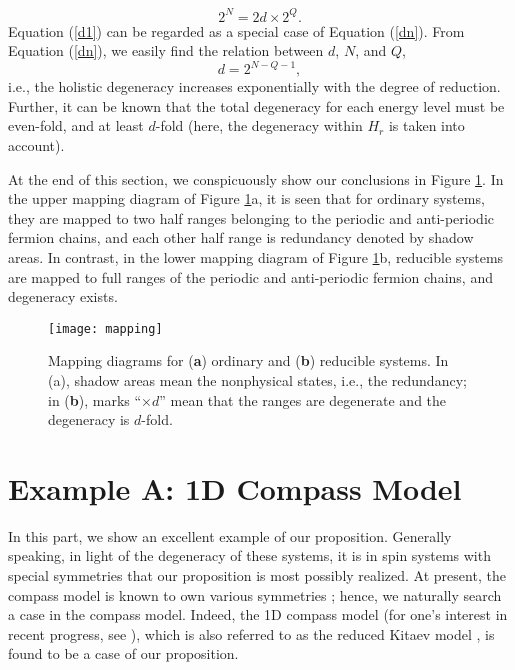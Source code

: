 \documentclass[twocolumn,floats,superscriptaddress]{revtex4}
\begin{document}
\begin{equation}\label{dn}
 2^N=2d\times2^Q.
\end{equation}
Equation (\ref{d1}) can be {regarded} as a special case of Equation (\ref{dn}). From Equation (\ref{dn}), we easily find the relation between $d$, $N$, and $Q$,
\begin{equation}\label{dNq}
d=2^{N-Q-1},
\end{equation}
i.e., the holistic degeneracy {increases exponentially with the degree of reduction}. Further, it can be known that the total degeneracy for each energy level must be even-fold, and at least $d$-fold (here, the degeneracy within $H_r$ is {taken into account}).

{At the end of this section, we conspicuously show our conclusions in Figure \ref{mapping}. In the upper mapping diagram of Figure \ref{mapping}a, it is seen that for ordinary systems, they are mapped to two half ranges belonging to the periodic and anti-periodic fermion chains, and each other half range is redundancy denoted by shadow areas. In contrast, in the lower mapping diagram of Figure \ref{mapping}b, reducible systems are mapped to full ranges of the periodic and anti-periodic fermion chains, and degeneracy exists.}

\begin{figure}[H]
\centering
\texttt{[image: mapping]}
\caption{ {Mapping diagrams for ({\bf a}) ordinary and ({\bf b}) reducible systems. In ({a}), shadow areas mean the nonphysical states, i.e., the redundancy; in ({\bf b}), marks ``$\times d$'' mean that the ranges are degenerate and the degeneracy is $d$-fold.}}
\label{mapping}
\end{figure}


\section{ {Example A: 1D Compass Model}}\label{exa}

In this part, we show an excellent example of our {proposition}. Generally speaking, in light of the degeneracy of these systems, it is in spin systems with special symmetries that our {proposition} is most possibly realized. At present, the compass model is known to own various symmetries \cite{Nussinov2015}; hence, we naturally search a case in the compass model. Indeed, the 1D compass model \cite{Brzezicki2007,Brzezicki2009} {(for one's interest in recent progress, see \cite{Jafari2017-1,Jafari2017-2,Jafari2017-3})}, which is also referred to as the reduced Kitaev model \cite{Feng2007}, is found to be a case of our {proposition}.
\end{document}
